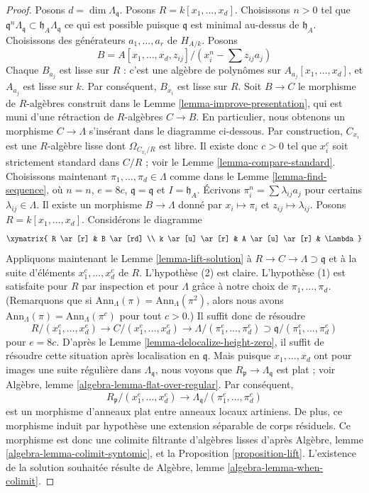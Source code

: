 \begin{proof}
Posons $d = \dim \Lambda_\mathfrak q$. Posons $R = k[x_1, \ldots, x_d]$.
Choisissons $n > 0$ tel que
$\mathfrak q^n\Lambda_\mathfrak q \subset \mathfrak h_A\Lambda_\mathfrak q$
ce qui est possible puisque $\mathfrak q$ est minimal au-dessus de $\mathfrak h_A$.
Choisissons des générateurs $a_1, \ldots, a_r$ de $H_{A/k}$. Posons
$$
B = A[x_1, \ldots, x_d, z_{ij}]/(x_i^n - \sum z_{ij}a_j)
$$
Chaque $B_{a_j}$ est lisse sur $R$ : c'est une algèbre de polynômes
sur $A_{a_j}[x_1, \ldots, x_d]$, et $A_{a_j}$ est lisse sur $k$.
Par conséquent, $B_{x_i}$ est lisse sur $R$. Soit $B \to C$ le morphisme de $R$-algèbres
construit dans le Lemme \ref{lemma-improve-presentation},
qui est muni d'une rétraction de $R$-algèbres $C \to B$. En particulier,
nous obtenons un morphisme $C \to \Lambda$ s'insérant dans le diagramme ci-dessous.
Par construction, $C_{x_i}$ est une $R$-algèbre lisse dont
$\Omega_{C_{x_i}/R}$ est libre. Il existe donc $c > 0$
tel que $x_i^c$ soit strictement standard dans $C/R$ ; voir le
Lemme \ref{lemma-compare-standard}.
Choisissons maintenant $\pi_1, \ldots, \pi_d \in \Lambda$ comme dans le
Lemme \ref{lemma-find-sequence},
où $n = n$, $e = 8c$, $\mathfrak q = \mathfrak q$ et $I = \mathfrak h_A$.
Écrivons $\pi_i^n = \sum \lambda_{ij} a_j$ pour certains $\lambda_{ij} \in \Lambda$.
Il existe un morphisme $B \to \Lambda$ donné par $x_i \mapsto \pi_i$
et $z_{ij} \mapsto \lambda_{ij}$. Posons $R = k[x_1, \ldots, x_d]$.
Considérons le diagramme
$$
\xymatrix{
R \ar[r] & B \ar[rd] \\
k \ar[u] \ar[r] & A \ar[u] \ar[r] & \Lambda
}
$$
Appliquons maintenant le
Lemme \ref{lemma-lift-solution}
à $R \to C \to \Lambda \supset \mathfrak q$
et à la suite d'éléments $x_1^c, \ldots, x_d^c$ de $R$.
L'hypothèse (2) est claire. L'hypothèse (1) est satisfaite pour $R$
par inspection et pour $\Lambda$ grâce à notre choix de
$\pi_1, \ldots, \pi_d$. (Remarquons que si
$\text{Ann}_\Lambda(\pi) = \text{Ann}_\Lambda(\pi^2)$, alors nous avons
$\text{Ann}_\Lambda(\pi) = \text{Ann}_\Lambda(\pi^c)$ pour tout $c > 0$.)
Il suffit donc de résoudre
$$
R/(x_1^e, \ldots, x_d^e) \to C/(x_1^e, \ldots, x_d^e) \to
\Lambda/(\pi_1^e, \ldots, \pi_d^e) \supset
\mathfrak q/(\pi_1^e, \ldots, \pi_d^e)
$$
pour $e = 8c$. D'après le
Lemme \ref{lemma-delocalize-height-zero},
il suffit de résoudre cette situation après localisation en $\mathfrak q$.
Mais puisque $x_1, \ldots, x_d$ ont pour images une suite régulière
dans $\Lambda_\mathfrak q$, nous voyons que $R_\mathfrak p \to \Lambda_\mathfrak q$
est plat ; voir Algèbre, lemme \ref{algebra-lemma-flat-over-regular}. Par conséquent,
$$
R_\mathfrak p/(x_1^e, \ldots, x_d^e) \to
\Lambda_\mathfrak q/(\pi_1^e, \ldots, \pi_d^e)
$$
est un morphisme d'anneaux plat entre anneaux locaux artiniens.
De plus, ce morphisme induit par hypothèse une extension séparable
de corps résiduels. Ce morphisme est donc une colimite filtrante
d'algèbres lisses d'après
Algèbre, lemme \ref{algebra-lemma-colimit-syntomic},
et la Proposition \ref{proposition-lift}.
L'existence de la solution souhaitée résulte de
Algèbre, lemme \ref{algebra-lemma-when-colimit}.
\end{proof}
